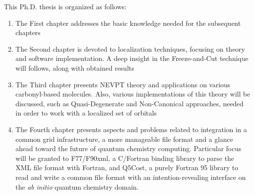 This Ph.D. thesis is organized as follows: 
\begin{enumerate}
\item The First chapter addresses the basic knowledge needed for the
subsequent chapters
\item The Second chapter is devoted to localization techniques,
focusing on theory and software implementation. A deep insight in the
\mbox{Freeze-and-Cut} technique will follows, along with obtained results
\item The Third chapter presents NEVPT theory and applications on
various carbonyl-based molecules. Also, various implementations of this
theory will be discussed, such as Quasi-Degenerate and Non-Canonical
approaches, needed in order to work with a localized set of orbitals
\item The Fourth chapter presents aspects and problems related to
integration in a common grid infrastructure, a more manageable file format
and a glance ahead toward the future of quantum chemistry computing.
Particular focus will be granted to F77/F90xml, a C/Fortran binding library to
parse the XML file format with Fortran, and Q5Cost, a purely Fortran 95
library to read and write a common file format with an intention-revealing
interface on the \textit{ab initio} quantum chemistry domain.
\end{enumerate}
